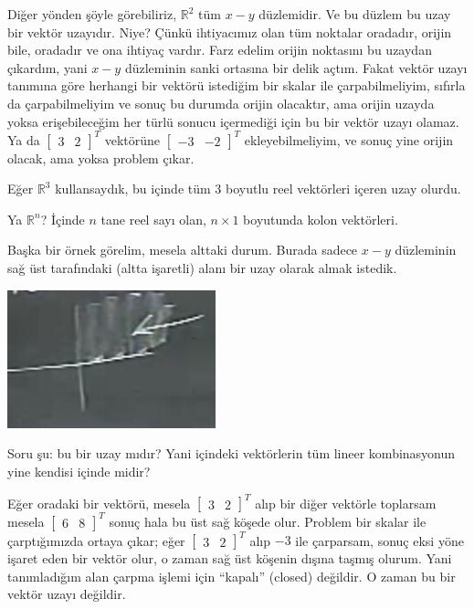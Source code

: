 \documentclass[12pt,fleqn]{article}\usepackage{../../common}
\begin{document}
Diğer yönden şöyle görebiliriz, $\mathbb{R}^2$ tüm $x-y$ düzlemidir. Ve bu
düzlem bu uzay bir vektör uzayıdır. Niye? Çünkü ihtiyacımız olan tüm noktalar
oradadır, orijin bile, oradadır ve ona ihtiyaç vardır. Farz edelim orijin
noktasını bu uzaydan çıkardım, yani $x-y$ düzleminin sanki ortasına bir delik
açtım. Fakat vektör uzayı tanımına göre herhangi bir vektörü istediğim bir
skalar ile çarpabilmeliyim, sıfırla da çarpabilmeliyim ve sonuç bu durumda
orijin olacaktır, ama orijin uzayda yoksa erişebileceğim her türlü sonucu
içermediği için bu bir vektör uzayı olamaz. Ya da
$\left[\begin{array}{cc}3&2\end{array}\right]^T$ vektörüne
$\left[\begin{array}{cc}-3&-2\end{array}\right]^T$ ekleyebilmeliyim, ve sonuç
yine orijin olacak, ama yoksa problem çıkar.

Eğer $\mathbb{R}^3$ kullansaydık, bu içinde tüm 3 boyutlu reel vektörleri
içeren uzay olurdu. 

Ya $\mathbb{R}^n$? İçinde $n$ tane reel sayı olan, $n \times 1$ boyutunda
kolon vektörleri. 

Başka bir örnek görelim, mesela alttaki durum. Burada sadece $x-y$
düzleminin sağ üst tarafındaki (altta işaretli) alanı bir uzay olarak almak
istedik. 

\includegraphics[height=4cm]{5_02.png}

Soru şu: bu bir uzay mıdır? Yani içindeki vektörlerin tüm lineer
kombinasyonun yine kendisi içinde midir? 

Eğer oradaki bir vektörü, mesela $\left[\begin{array}{rr}3 &
 2\end{array}\right]^T$ alıp bir diğer vektörle toplarsam mesela
$\left[\begin{array}{rr}6 & 8\end{array}\right]^T$ sonuç hala bu üst 
sağ köşede olur. Problem bir skalar ile çarptığımızda ortaya çıkar; eğer
$\left[\begin{array}{rr}3 & 2\end{array}\right]^T$ alıp $-3$ ile çarparsam, 
sonuç eksi yöne işaret eden bir vektör olur, o zaman sağ üst köşenin dışına
taşmış olurum. Yani tanımladığım alan çarpma işlemi için ``kapalı''
(closed) değildir. O zaman bu bir vektör uzayı değildir. 
\end{document}
